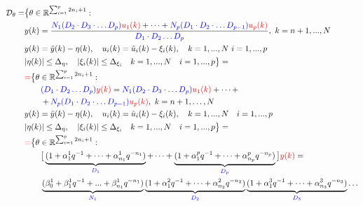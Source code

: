 \begin{equation}
    \begin{aligned}
        \mathcal{D}_\theta = &\big\{
            \theta\in\mathbb{R}^{\sum_{i=1}^p{2n_i+1}}:\\
            & y(k)=\frac{
                {\color{blue}N_1({D_2 \cdot D_3 \cdot \dots D_p})} {\color{red}u_1(k)}+
                \dots+
                {\color{blue}N_p({D_1\cdot D_2 \cdot \dots D_{p-1}})} {\color{red} u_p(k)}
            }{{\color{blue}D_1 \cdot D_2 \dots D_p}}, \ k=n+1,...,N\\
            &y(k)=\tilde{y}(k)-\eta(k), \quad
            u_i(k)=\tilde{u}_i(k)-\xi_i(k), \quad k=1, ..., N \ i=1,...,p\\
            &
            \vert \eta(k) \vert \le \Delta_\eta, \quad \vert \xi_i(k) \vert \le \Delta_{\xi_i} \quad k=1,...,N \quad i=1,...,p
            \big\}=\\
            &{\color{red}=}\big\{
                \theta\in\mathbb{R}^{\sum_{i=1}^p{2n_i+1}}:\\
                &\qquad{\color{blue}(D_1 \cdot D_2 \dots D_p)} {\color{red}y(k)} = 
                {\color{blue}N_1({D_2 \cdot D_3 \cdot \dots D_p})} {\color{red}u_1(k)}+
                \dots+\\
                &\qquad +
                {\color{blue}N_p({D_1\cdot D_2 \cdot \dots D_{p-1}})} {\color{red}u_p(k)}, \ k=n+1,\dots,N\\
                &y(k)=\tilde{y}(k)-\eta(k), \quad
                u_i(k)=\tilde{u}_i(k)-\xi_i(k), \quad k=1, ..., N \quad i=1,...,p\\
            &\vert \eta(k) \vert \le \Delta_\eta, \quad \vert \xi_i(k) \vert \le \Delta_{\xi_i} \quad k=1,...,N \quad i=1,...,p
            \big\}=\\
            &{\color{red}=}\big\{
                \theta\in\mathbb{R}^{\sum_{i=1}^p{2n_i+1}}:\\
                &\qquad\big[   
                    \underbrace{(1+\alpha_1^1{q^{-1}}+\dots+\alpha_{n_1}^1q^{-{n_1}})}_{\color{blue}D_1}+\dots+
                    \underbrace{(1+\alpha_1^p{q^{-1}}+\dots+\alpha_{n_p}^p q^{-{n_p}})}_{\color{blue}D_p}
                \big] {\color{red}y(k)} =\\
                & \qquad \underbrace{(\beta_0^1 +\beta_1^1 q^{-1}+...+\beta_{n_1}^1 q^{-{n_1}})}_{\color{blue}N_1}
                \underbrace{(1+\alpha_1^2{q^{-1}}+\dots+\alpha_{n_2}^2q^{-{n_2}})}_{\color{blue}D_2} %
                \underbrace{(1+\alpha_1^3{q^{-1}}+\dots+\alpha_{n_3}^3q^{-{n_3}})}_{\color{blue}D_3} \dots\\

\end{aligned}
\end{equation}
